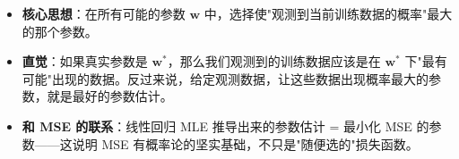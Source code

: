 \documentclass[a4paper,11pt]{ctexart}
\begin{document}
\begin{beginnerbox}
    \begin{itemize}
        \item \textbf{核心思想}：在所有可能的参数 $\boldsymbol{w}$ 中，选择使"观测到当前训练数据的概率"最大的那个参数。
        \item \textbf{直觉}：如果真实参数是 $\boldsymbol{w}^*$，那么我们观测到的训练数据应该是在 $\boldsymbol{w}^*$ 下"最有可能"出现的数据。反过来说，给定观测数据，让这些数据出现概率最大的参数，就是最好的参数估计。
        \item \textbf{和 MSE 的联系}：线性回归 MLE 推导出来的参数估计 = 最小化 MSE 的参数——这说明 MSE 有概率论的坚实基础，不只是"随便选的"损失函数。
    \end{itemize}
\end{beginnerbox}
\end{document}
